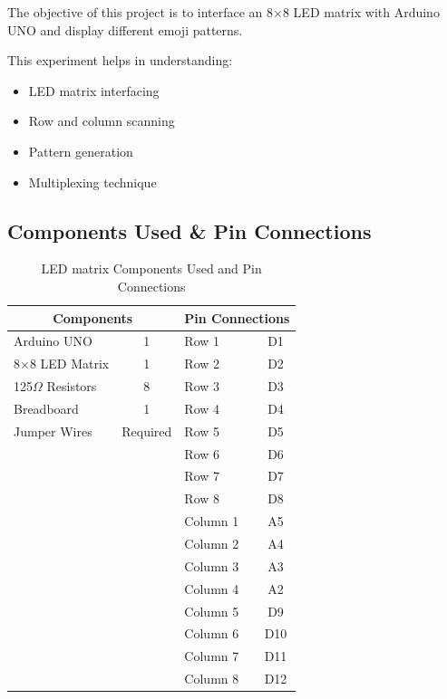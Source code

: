 The objective of this project is to interface an 8×8 LED matrix with Arduino UNO and display different emoji patterns.

This experiment helps in understanding:

\begin{itemize}
    \item LED matrix interfacing
    \item Row and column scanning
    \item Pattern generation
    \item Multiplexing technique
\end{itemize}

\subsection{Components Used \& Pin Connections}

\begin{table}[H]
\centering
\caption{LED matrix Components Used and Pin Connections}
\label{tab:ledmatrix}

\begin{tabular}{|l|c|l|c|}
\hline
\multicolumn{2}{|c|}{\textbf{Components}} &
\multicolumn{2}{c|}{\textbf{Pin Connections}}\\
\hline
Arduino UNO & 1 & Row 1 & D1\\
8×8 LED Matrix & 1 & Row 2 & D2\\
125$\Omega$ Resistors & 8 & Row 3 & D3\\
Breadboard & 1 & Row 4 & D4\\
Jumper Wires & Required & Row 5 & D5\\
 &  & Row 6 & D6\\
 &  & Row 7 & D7\\
 &  & Row 8 & D8\\
 &  & Column 1 & A5\\
 &  & Column 2 & A4\\
 &  & Column 3 & A3\\
 &  & Column 4 & A2\\
 &  & Column 5 & D9\\
 &  & Column 6 & D10\\
 &  & Column 7 & D11\\
 &  & Column 8 & D12\\
\hline
\end{tabular}

\end{table}


